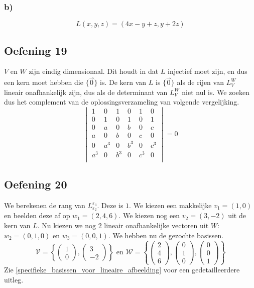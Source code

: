 \documentclass[lineaire_algebra_oplossingen.tex]{subfiles}
\begin{document}
\subsubsection*{b)} %
\[
L(x,y,z) = (4x-y+z,y+2z)
\]

\subsection{Oefening 19}
$V$ en $W$ zijn eindig dimensionaal. Dit houdt in dat $L$ injectief moet zijn, en dus een kern moet hebben die $\{\vec{0}\}$ is. De kern van $L$ is $\{\vec{0}\}$ als de rijen van $L_V^W$ lineair onafhankelijk zijn, dus als de determinant van $L_V^W$ niet nul is. We zoeken dus het complement van de oplossingsverzameling van volgende vergelijking.
\[
\begin{vmatrix}
1 & 0 & 1 & 0 & 1 & 0\\
0 & 1 & 0 & 1 & 0 & 1\\
0 & a & 0 & b & 0 & c\\
a & 0 & b & 0 & c & 0\\
0 & a^3 & 0 & b^3 & 0 & c^3\\
a^3 & 0 & b^3 & 0 & c^3 & 0\\
\end{vmatrix}
= 0
\]

\subsection{Oefening 20}
We berekenen de rang van $L_{\varepsilon_2}^{\varepsilon_3}$. Deze is $1$.
We kiezen een makkelijke $v_1 = (1,0)$ en beelden deze af op $w_1 = (2,4,6)$. We kiezen nog een $v_2 = (3,-2)$ uit de kern van $L$. Nu kiezen we nog 2 lineair onafhankelijke vectoren uit $W$: $w_2 = (0,1,0)$ en $w_3 = (0,0,1)$. We hebben nu de gezochte basissen.
\[
\mathcal{V} =
\left\{
\begin{pmatrix}
1\\0
\end{pmatrix}
,
\begin{pmatrix}
3\\-2
\end{pmatrix}
\right\}
\text{ en }
\mathcal{W} =
\left\{
\begin{pmatrix}
2\\4\\6
\end{pmatrix}
,
\begin{pmatrix}
0\\1\\0
\end{pmatrix}
,
\begin{pmatrix}
0\\0\\1
\end{pmatrix}
\right\}
\]
Zie \ref{specifieke_basissen_voor_lineaire_afbeelding} voor een gedetailleerdere uitleg.
\end{document}
